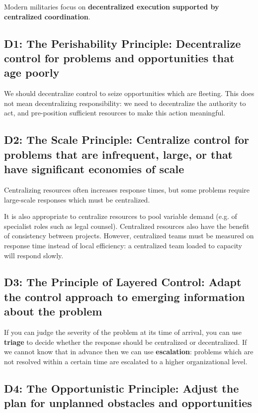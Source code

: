 \documentclass{article}
\begin{document}
\begin{multicols}{2}

\noindent
Modern militaries focus on \textbf{decentralized execution supported by centralized coordination}.

\subsection{D1: The Perishability Principle: Decentralize control for problems and opportunities that age poorly}

We should decentralize control to seize opportunities which are fleeting. This does not mean decentralizing responsibility: we need to decentralize the authority to act, and pre-position sufficient resources to make this action meaningful.

\subsection{D2: The Scale Principle: Centralize control for problems that are infrequent, large, or that have significant economies of scale}

Centralizing resources often increases response times, but some problems require large-scale responses which must be centralized.

It is also appropriate to centralize resources to pool variable demand (e.g. of specialist roles such as legal counsel). Centralized resources also have the benefit of consistency between projects. However, centralized teams must be measured on response time instead of local efficiency: a centralized team loaded to capacity will respond slowly.

\subsection{D3: The Principle of Layered Control: Adapt the control approach to emerging information about the problem}

If you can judge the severity of the problem at its time of arrival, you can use \textbf{triage} to decide whether the response should be centralized or decentralized. If we cannot know that in advance then we can use \textbf{escalation}: problems which are not resolved within a certain time are escalated to a higher organizational level.

\subsection{D4: The Opportunistic Principle: Adjust the plan for unplanned obstacles and opportunities}


\end{multicols}
\end{document}
